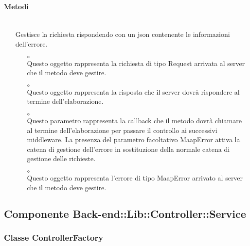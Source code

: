 \paragraph*{Metodi}
\begin{itemize}
\item[]  \\ Gestisce la richiesta rispondendo con un json contenente le informazioni dell'errore.
\begin{itemize}\addtolength{\itemsep}{-0.5\baselineskip}
\item[$\circ$]  \\ Questo oggetto rappresenta la richiesta di tipo Request arrivata al server che il metodo deve gestire.
\item[$\circ$]  \\ Questo oggetto rappresenta la risposta che il server dovrà rispondere al termine dell'elaborazione.
\item[$\circ$]  \\ Questo parametro rappresenta la callback che il metodo dovrà chiamare al termine dell'elaborazione per passare il controllo ai successivi middleware. La presenza del parametro facoltativo MaapError attiva la catena di gestione dell'errore in sostituzione della normale catena di gestione delle richieste.
\item[$\circ$]  \\ Questo oggetto rappresenta l'errore di tipo MaapError arrivato al server che il metodo deve gestire.
\end{itemize}
\end{itemize}

\subsection{Componente Back-end::Lib::Controller::Service}

\subsubsection{Classe ControllerFactory}

